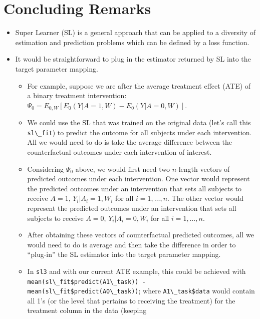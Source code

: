 \documentclass[
  12pt, krantz2,
]{krantz}
\newcommand{\passthrough}[1]{#1}
\providecommand{\tightlist}{%
  \setlength{\itemsep}{0pt}\setlength{\parskip}{0pt}}
\newcommand{\1}{\mathbbm{1}}
\theoremstyle{definition}
\theoremstyle{definition}
\theoremstyle{definition}
\theoremstyle{definition}
\theoremstyle{remark}
\begin{document}
\hypertarget{concluding-remarks}{%
\section{Concluding Remarks}\label{concluding-remarks}}

\begin{itemize}
\item
  Super Learner (SL) is a general approach that can be applied to a diversity of
  estimation and prediction problems which can be defined by a loss function.
\item
  It would be straightforward to plug in the estimator returned by SL into the
  target parameter mapping.

  \begin{itemize}
  \tightlist
  \item
    For example, suppose we are after the average treatment effect (ATE) of a
    binary treatment intervention:
    \(\Psi_0 = E_{0,W}[E_0(Y|A=1,W) - E_0(Y|A=0,W)]\).
  \item
    We could use the SL that was trained on the original data (let's call
    this \passthrough{\lstinline!sl\_fit!}) to predict the outcome for all subjects under each
    intervention. All we would need to do is take the average difference
    between the counterfactual outcomes under each intervention of interest.
  \item
    Considering \(\Psi_0\) above, we would first need two \(n\)-length vectors of
    predicted outcomes under each intervention. One vector would represent
    the predicted outcomes under an intervention that sets all subjects to
    receive \(A=1\), \(Y_i|A_i=1,W_i\) for all \(i=1,\ldots,n\). The other vector
    would represent the predicted outcomes under an intervention that sets
    all subjects to receive \(A=0\), \(Y_i|A_i=0,W_i\) for all \(i=1,\ldots,n\).
  \item
    After obtaining these vectors of counterfactual predicted outcomes, all
    we would need to do is average and then take the difference in order to
    ``plug-in'' the SL estimator into the target parameter mapping.
  \item
    In \passthrough{\lstinline!sl3!} and with our current ATE example, this could be achieved with
    \passthrough{\lstinline!mean(sl\_fit$predict(A1\_task)) - mean(sl\_fit$predict(A0\_task))!};
    where \passthrough{\lstinline!A1\_task$data!} would contain all 1's (or the level that pertains to
    receiving the treatment) for the treatment column in the data (keeping

\end{itemize}
\end{itemize}
\end{document}
